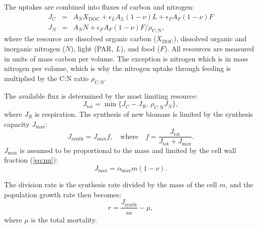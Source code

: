 \documentclass[11pt]{article}
\newcommand{\Jmax}[1][]{J_\mathrm{max}#1}
\newcommand{\rCN}{\rho_\mathrm{C:N}}
\begin{document}
The uptakes are combined into fluxes of carbon and nitrogen:
\begin{eqnarray}
  \label{eq:uptake}
  J_C &=& A_N X_\mathrm{DOC} + \epsilon_L A_L(1-\nu)  L + \epsilon_F A_F (1-\nu) F \\
  J_N &=& A_N N + \epsilon_F A_F (1-\nu) F/\rho_\mathrm{C:N},
\end{eqnarray}
where the resource are dissolved organic carbon ($X_\mathrm{DOC}$), dissolved organic and inorganic nitrogen ($N$), light (PAR, $L$), and food ($F$).  All resources are measured in units of mass carbon per volume.  The exception is nitrogen which is in mass nitrogen per volume, which is why the nitrogen uptake through feeding is multiplied by the C:N ratio $\rCN$.

The available flux is determined by the most limiting resource:
\begin{equation}
  \label{eq:Liebig}
  J_\mathrm{tot} = \min\{J_C - J_R,\, \rho_\mathrm{C:N} J_N\},
\end{equation}
where $J_R$ is respiration.  The synthesis of new biomass is limited by the synthesis capacity $J_\mathrm{max}$:
\begin{equation}
  \label{eq:synth}
  J_\mathrm{synth} = \Jmax[] f, \quad \mathrm{where} \quad f = \frac{J_\mathrm{tot}}{ J_\mathrm{tot} + \Jmax[]}.
\end{equation}
$\Jmax$ is assumed to be proportional to the mass and limited by the cell wall fraction (\ref{eq:nu}):
\begin{equation}
  \label{eq:Jmax}
  \Jmax = \alpha_\mathrm{max} m (1-\nu).
\end{equation}

The division rate is the synthesis rate divided by the mass of the cell $m$, and the population growth rate then becomes:
\begin{equation}
  \label{eq:5}
  r = \frac{ J_\mathrm{synth}}{m} - \mu,
\end{equation}
where $\mu$ is the total mortality.
\end{document}
